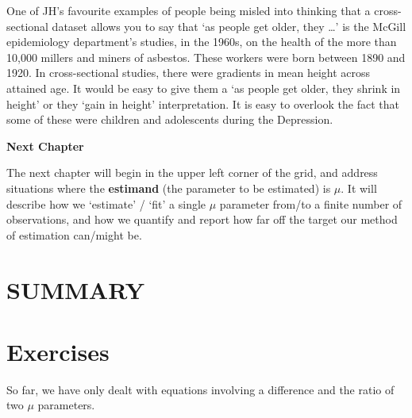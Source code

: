 \documentclass[]{book}
\begin{document}
One of JH's favourite examples of people being misled into thinking that a cross-sectional dataset allows you to say that `as people get older, they \ldots{}' is the McGill epidemiology department's studies, in the 1960s, on the health of the more than 10,000 millers and miners of asbestos. These workers were born between 1890 and 1920. In cross-sectional studies, there were gradients in mean height across attained age. It would be easy to give them a `as people get older, they shrink in height' or they `gain in height' interpretation. It is easy to overlook the fact that some of these were children and adolescents during the Depression.

\textbf{Next Chapter}

The next chapter will begin in the upper left corner of the grid, and address situations where the \textbf{estimand} (the parameter to be estimated) is \(\mu.\) It will describe how we `estimate' / `fit' a single \(\mu\) parameter from/to a finite number of observations, and how we quantify and report how far off the target our method of estimation can/might be.

\hypertarget{summary-1}{%
\section{SUMMARY}\label{summary-1}}

\hypertarget{exercises-2}{%
\section{Exercises}\label{exercises-2}}

So far, we have only dealt with equations involving a difference and the ratio of two \(\mu\) parameters.
\end{document}
